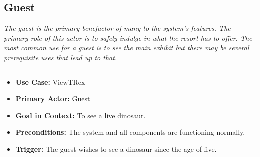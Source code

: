 \documentclass[12pt]{article}
\begin{document}
    \subsection{Guest}
    \textit{The guest is the primary benefactor of many to the system's features. The primary role of this
    actor is to safely indulge in what the resort has to offer. The most common use for a guest is to see the main
    exhibit but there may be several prerequisite uses that lead up to that.}
    \par\noindent\rule{\textwidth}{0.4pt}    
    \begin{itemize}
        \item[]\textbf{Use Case:}                                
            ViewTRex

        \item[]\textbf{Primary Actor:}
            Guest

        \item[]\textbf{Goal in Context:}
            To see a live dinosaur.

        \item[]\textbf{Preconditions:}
            The system and all components are functioning normally.
            
        \item[]\textbf{Trigger:}
            The guest wishes to see a dinosaur since the age of five.


\end{itemize}
\end{document}
